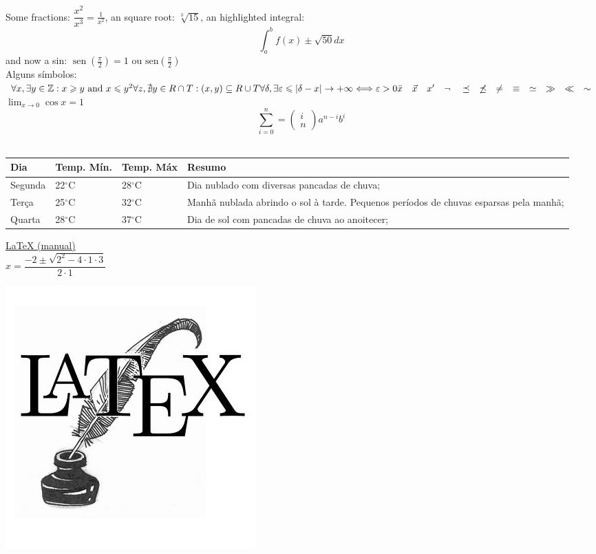\documentclass[12pt, a4paper]{article} %
\newcommand{\bigmc}[3]{$x=\dfrac{- #2 \pm\sqrt{#2^2-4\cdot#1\cdot#3}}{2\cdot#1}$}
\DeclareMathOperator{\seno}{sen}
\begin{document}
Some fractions: $\dfrac{x^2}{x^3} = \frac{1}{x^2}$, an square root: $\sqrt[3]{15}$, an highlighted integral: $$\int_{a}^{b}f(x)\pm \sqrt{50} dx$$ and now a sin: $\seno(\frac{\pi}{2}) = 1\text{ ou sen}(\frac{\pi}{2})$ \\
Alguns símbolos:
$
\forall x, \exists y\in\mathbb{Z} : x \geqslant y \text{ and } x \leqslant y^2 \\
\forall z, \nexists y \in R\cap T : {(x,y)}  \subseteq R\cup T \\
\forall \delta, \exists \varepsilon \leqslant |\delta - x| \rightarrow +\infty \Longleftrightarrow \varepsilon > 0 \\
\bar{x} \quad \vec{x} \quad x^\prime \quad \neg \quad \preceq \quad \not \preceq \quad \not =
\quad \equiv \quad \simeq \quad \gg \quad \ll \quad \sim$ \\
$\displaystyle \lim_{x\rightarrow0}\cos x = 1$ %
$$\boxed{\sum_{i=0}^n = \begin{pmatrix} i \\ n \end{pmatrix} a^{n-i}b^i}$$ \\

\begin{center}
\begin{tabular}{ | l | l | l | p{5cm} |} \hline 
Dia& Temp. Mín.  & Temp. Máx & Resumo\\ \hline
Segunda & 22$^\circ$C   & 28$^\circ$C  & Dia nublado com diversas pancadas de chuva;\\ \hline
Terça       & 25$^\circ$C   & 32$^\circ$C  & Manhã nublada abrindo o sol à tarde.  Pequenos períodos de chuvas esparsas pela manhã;\\ \hline
Quarta    & 28$^\circ$C   & 37$^\circ$C  & Dia de sol com pancadas de chuva ao anoitecer; \\ \hline
\end{tabular}
\end{center}

\href{http://www.ctan.org/tex-archive/info/lshort/english/lshort.pdf}{LaTeX (manual)}\\
\bigmc{1}{2}{3}

\includegraphics[scale=0.5]{latex.png}
\end{document}
